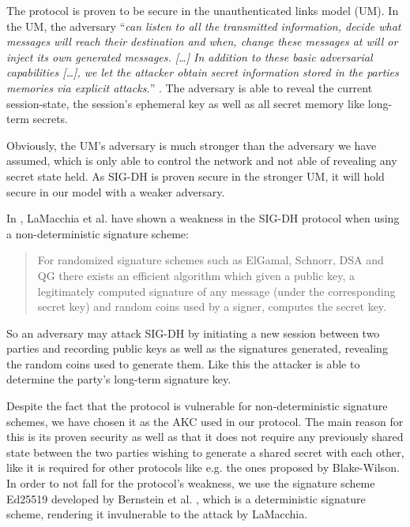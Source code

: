 The protocol is proven to be secure in the unauthenticated links model (UM).
In the UM, the adversary ``\emph{can listen to all the transmitted information, decide what messages will reach their destination and when, change these messages at will or inject its own generated messages. [\ldots] In addition to these basic adversarial capabilities [\ldots], we let the attacker obtain secret information stored in the parties memories via explicit attacks.}'' \cite{canetti2001analysis}.
The adversary is able to reveal the current session-state, the session's ephemeral key as well as all secret memory like long-term secrets.

Obviously, the UM's adversary is much stronger than the adversary we have assumed, which is only able to control the network and not able of revealing any secret state held.
As SIG-DH is proven secure in the stronger UM, it will hold secure in our model with a weaker adversary.

In \cite{lamacchia2007stronger}, LaMacchia et al. have shown a weakness in the SIG-DH protocol when using a non-deterministic signature scheme:
\begin{quote}
    For randomized signature schemes such as ElGamal, Schnorr, DSA and QG there exists an efficient algorithm which given a public key, a legitimately computed signature of any message (under the corresponding secret key) and random coins used by a signer, computes the secret key. \cite{lamacchia2007stronger}
\end{quote}
So an adversary may attack SIG-DH by initiating a new session between two parties and recording public keys as well as the signatures generated, revealing the random coins used to generate them.
Like this the attacker is able to determine the party's long-term signature key.

Despite the fact that the protocol is vulnerable for non-deterministic signature schemes, we have chosen it as the AKC used in our protocol.
The main reason for this is its proven security as well as that it does not require any previously shared state between the two parties wishing to generate a shared secret with each other, like it is required for other protocols like e.g. the ones proposed by Blake-Wilson.
In order to not fall for the protocol's weakness, we use the signature scheme Ed25519 developed by Bernstein et al. \cite{bernstein2012high}, which is a deterministic signature scheme, rendering it invulnerable to the attack by LaMacchia.

\bigskip

